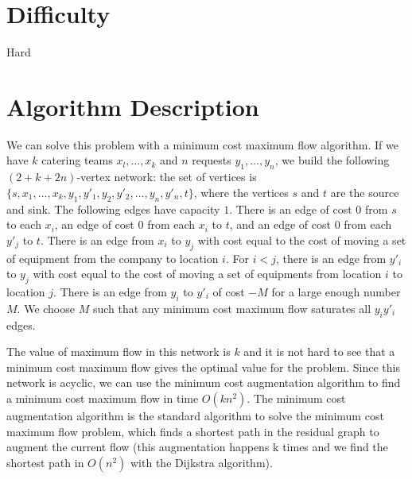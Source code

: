 \documentclass[10pt]{article}
\begin{document}
\section*{Difficulty}
Hard

\section*{Algorithm Description}
We can solve this problem with a minimum cost maximum flow algorithm.  If  we  have  $k$  catering teams  $x_l, \dots , x_k$ and $n$ requests $y_1, ..., y_n$, we  build  the following $(2+k+2n)$-vertex network:  the  set of vertices is  $\{s, x_1, ..., x_k, y_1, y'_1, y_2, y'_2, \dots, y_n, y'_n, t\}$, where the vertices $s$ and $t$ are the source and sink. The following edges have capacity $1$. There is an edge of cost $0$ from $s$ to each $x_i$, an edge of cost $0$ from each $x_i$ to $t$, and an edge of cost $0$ from each $y'_j$ to $t$. There is an edge from $x_i$ to $y_j$ with cost equal to the cost of moving a set of equipment from the company to location $i$. For $i < j$, there is an edge from $y'_i$ to $y_j$ with cost equal to the cost of moving a set of equipments from location $i$ to location $j$. There is an edge from $y_i$ to $y'_i$ of cost $-M$ for a large enough number $M$. We choose $M$ such that any minimum cost maximum flow saturates all $y_iy'_i$ edges. 

The value of maximum flow in this network is $k$ and it is not hard to see that a minimum cost maximum flow gives the optimal value for the problem. Since this network is acyclic, we can use the minimum cost augmentation algorithm to find a minimum cost maximum flow in time $O(kn^2)$. The minimum cost augmentation algorithm is the standard algorithm to solve the minimum cost maximum flow problem, which finds a shortest path in the residual graph to augment the current flow (this augmentation happens k times and we find the shortest path in $O(n^2)$ with the Dijkstra algorithm). 
\end{document}
